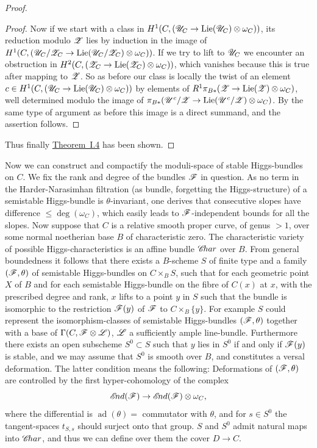 \documentclass[12pt,english]{smfart}
\theoremstyle{plain} \newtheorem{innerthm}{Theorem} \newtheorem{innerlem}{Lemma} \newtheorem{innerprop}{Proposition} \newtheorem{innercor}{Corollary} \theoremstyle{definition} \newtheorem{innerdefn}{Definition} \newtheorem{innerconstr}{Construction} \theoremstyle{remark} \newtheorem*{remark}{Remark} \newtheorem*{remarks}{Remarks} \newtheorem*{applications}{Applications}
\newcommand{\refthm}[1]{\hyperref[thm:#1]{Theorem~#1}} \newcommand{\reflem}[1]{\hyperref[lem:#1]{Lemma~#1}} \newcommand{\refprop}[1]{\hyperref[prop:#1]{Proposition~#1}} \newcommand{\refcor}[1]{\hyperref[cor:#1]{Corollary~#1}} \newcommand{\refdef}[1]{\hyperref[def:#1]{Definition~#1}} \newcommand{\refconstr}[1]{\hyperref[constr:#1]{Construction~#1}} \newcommand{\refsec}[1]{\hyperref[sec:#1]{\S#1}}
\begin{document}
\begin{proof}
\begin{proof}
Now if we start with a class in $H^1(C,(\mathscr{U}_C\to\operatorname{Lie}(\mathscr{U}_C)\otimes\omega_C))$, its reduction modulo $\mathscr{Z}$ lies by induction in the image of $H^1(C,(\mathscr{U}_C/\mathscr{Z}_C\to\operatorname{Lie}(\mathscr{U}_C/\mathscr{Z}_C)\otimes\omega_C))$. If we try to lift to $\mathscr{U}_C$ we encounter an obstruction in $H^2(C,(\mathscr{Z}_C\to\operatorname{Lie}(\mathscr{Z}_C)\otimes\omega_C))$, which vanishes because this is true after mapping to $\mathscr{Z}$. So as before our class is locally the twist of an element $c\in H^1(C,(\mathscr{U}_C\to\operatorname{Lie}(\mathscr{U}_C)\otimes\omega_C))$ by elements of $R^1\pi_{B*}(\mathscr{Z}\to\operatorname{Lie}(\mathscr{Z})\otimes\omega_C)$, well determined modulo the image of $\pi_{B*}(\mathscr{U}^c/\mathscr{Z}\to\operatorname{Lie}(\mathscr{U}^c/\mathscr{Z})\otimes\omega_C)$. By the same type of argument as before this image is a direct summand, and the assertion follows.
\end{proof}

Thus finally \refthm{I.4} has been shown.
\end{proof}

Now we can construct and compactify the moduli-space of stable Higgs-bundles on $C$. We fix the rank and degree of the bundles $\mathscr{F}$ in question. As no term in the Harder-Narasimhan filtration (as bundle, forgetting the Higgs-structure) of a semistable Higgs-bundle is $\theta$-invariant, one derives that consecutive slopes have difference $\le\deg(\omega_C)$, which easily leads to $\mathscr{F}$-independent bounds for all the slopes. Now suppose that $C$ is a relative smooth proper curve, of genus $>1$, over some normal noetherian base $B$ of characteristic zero. The characteristic variety of possible Higgs-characteristics is an affine bundle $\mathscr{C}\!har$ over $B$. From general boundedness it follows that there exists a $B$-scheme $S$ of finite type and a family $(\mathscr{F},\theta)$ of semistable Higgs-bundles on $C\times_B S$, such that for each geometric point $X$ of $B$ and for each semistable Higgs-bundle on the fibre of $C(x)$ at $x$, with the prescribed degree and rank, $x$ lifts to a point $y$
in $S$ such that the bundle is isomorphic to the restriction $\mathscr{F}(y)$ of $\mathscr{F}$ to $C\times_B\{y\}$. For example $S$ could represent the isomorphism-classes of semistable Higgs-bundles $(\mathscr{F},\theta)$ together with a base of $\Gamma(C,\mathscr{F}\otimes\mathscr{L})$, $\mathscr{L}$ a sufficiently ample line-bundle. Furthermore there exists an open subscheme $S^0\subset S$ such that $y$ lies in $S^0$ if and only if $\mathscr{F}(y)$ is stable, and we may assume that $S^0$ is smooth over $B$, and constitutes a versal deformation. The latter condition means the following: Deformations of $(\mathscr{F},\theta)$ are controlled by the first hyper-cohomology of the complex
\[
\mathscr{E}\!nd(\mathscr{F})\to\mathscr{E}\!nd(\mathscr{F})\otimes\omega_C,
\]
where the differential is $\operatorname{ad}(\theta)=$ commutator with $\theta$, and for $s\in S^0$ the tangent-spaces $t_{S,s}$ should surject onto that group. $S$ and $S^0$ admit natural maps into $\mathscr{C}\!har$, and thus we can define over them the cover $D\to C$.
\end{document}
